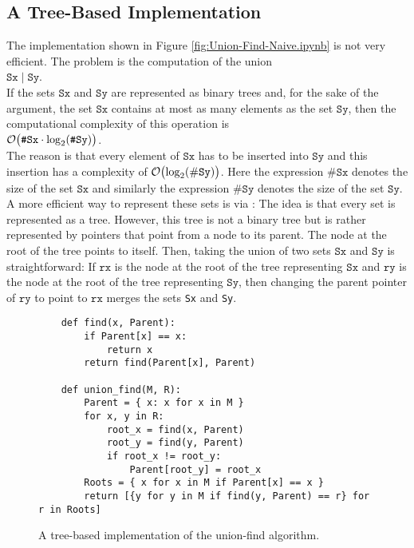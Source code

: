 \subsection{A Tree-Based Implementation}
The implementation shown in Figure \ref{fig:Union-Find-Naive.ipynb} is not very efficient.  The
problem is the computation of the union
\\
\hspace*{1.3cm}
$\texttt{Sx} \;|\; \texttt{Sy}$.
\\[0.2cm]
If the sets $\texttt{Sx}$ and $\texttt{Sy}$ are represented as binary trees and, for the sake of the
argument, the set $\texttt{Sx}$ contains at most as many elements as the set $\texttt{Sy}$, then the
computational complexity of this operation is
\\
\hspace*{1.3cm}
$\mathcal{O}\bigl(\texttt{\#Sx} \cdot \log_2(\texttt{\#Sy})\bigr)$.  
\\[0.2cm]
The reason is that every element of $\texttt{Sx}$ has to be inserted into $\texttt{Sy}$ and this
insertion has a complexity of $\mathcal{O}\bigl(\log_2(\#\texttt{Sy})\bigr)$.  Here the expression
$\texttt{\#Sx}$ denotes the size of the set $\texttt{Sx}$ and similarly the expression
$\texttt{\#Sy}$ denotes the size of the set $\texttt{Sy}$.  A more efficient way to
represent these sets is via :  The idea is that every set is represented as a
tree.  However, this tree is not a binary tree but is rather represented by pointers that
point from a node to its parent.  The node at the root of the tree points to itself.  Then, taking the
union of two sets $\texttt{Sx}$ and $\texttt{Sy}$ is straightforward:  If $\texttt{rx}$ is the node at the root of
the tree representing $\texttt{Sx}$ and $\texttt{ry}$ is the node at the root of the tree representing
$\texttt{Sy}$, then changing the parent pointer of $\texttt{ry}$ to point to $\texttt{rx}$ merges the
sets \texttt{Sx} and \texttt{Sy}.


\begin{figure}[!ht]
\centering
\begin{verbatim}
    def find(x, Parent):
        if Parent[x] == x:
            return x
        return find(Parent[x], Parent)

    def union_find(M, R):
        Parent = { x: x for x in M } 
        for x, y in R:
            root_x = find(x, Parent)
            root_y = find(y, Parent)
            if root_x != root_y:
                Parent[root_y] = root_x
        Roots = { x for x in M if Parent[x] == x }
        return [{y for y in M if find(y, Parent) == r} for r in Roots]
\end{verbatim}
\vspace*{-0.3cm}
\caption{A tree-based implementation of the union-find algorithm.}
\label{fig:Union-Find-Tree.ipynb}
\end{figure}

